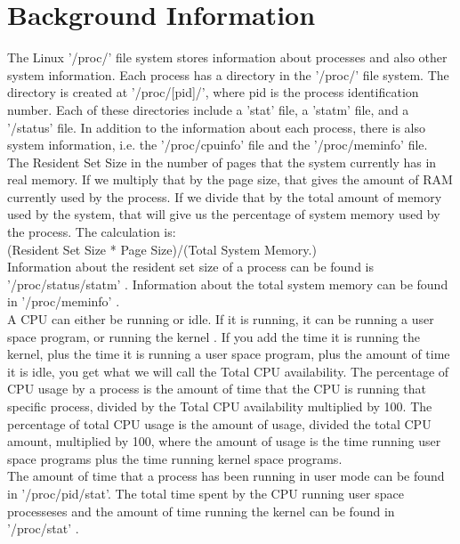 \documentclass[12pt]{article}
\begin{document}
	\section{Background Information}
	The Linux '/proc/' file system stores information about processes and also other system information. Each process has a directory in the '/proc/' file system\cite[p. 792]{text}. The directory is created at '/proc/[pid]/', where pid is the process identification number. Each of these directories include a 'stat' file, a 'statm' file, and a '/status' file. In addition to the information about each process, there is also system information, i.e. the '/proc/cpuinfo' file and the '/proc/meminfo' file.\\
	The Resident Set Size in the number of pages that the system currently has in real memory.
	If we multiply that by the page size, that gives the amount of RAM currently used by the process.
	If we divide that by the total amount of memory used by the system, that will give us the percentage of system memory used by the process.
	The calculation is:\\
	(Resident Set Size * Page Size)/(Total System Memory.)\\
	Information about the resident set size of a process can be found is '/proc/status/statm' \cite{manProc}.
	Information about the total system memory can be found in '/proc/meminfo' \cite{manProc}.\\

A CPU can either be running or idle.
If it is running, it can be running a user space program, or running the kernel \cite{scoutBlog}.
If you add the time it is running the kernel, plus the time it is running a user space program, plus the amount of time it is idle, you get what we will call the Total CPU availability.
The percentage of CPU usage by a process is the amount of time that the CPU is running that specific process, divided by the Total CPU availability multiplied by 100.
The percentage of total CPU usage is the amount of usage, divided the total CPU amount, multiplied by 100, where the amount of usage is the time running user space programs plus the time running kernel space programs.\\
The amount of time that a process has been running in user mode can be found in '/proc/pid/stat'. \cite{manProc}
The total time spent by the CPU running user space processeses and the amount of time running the kernel can be found in '/proc/stat' \cite{manProc}.\\
	
\end{document}
